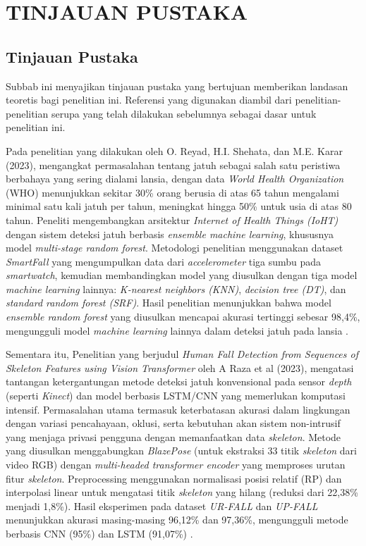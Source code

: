 \newpage
\chapter{TINJAUAN PUSTAKA} \label{Bab II}

\section{Tinjauan Pustaka} \label{II.Tinjauan}
Subbab ini menyajikan tinjauan pustaka yang bertujuan memberikan landasan teoretis bagi penelitian ini. Referensi yang digunakan diambil dari penelitian-penelitian serupa yang telah dilakukan sebelumnya sebagai dasar untuk penelitian ini. \par
\renewcommand{\arraystretch}{1.0} %

Pada penelitian yang dilakukan oleh O. Reyad, H.I. Shehata, dan M.E. Karar (2023), mengangkat permasalahan tentang jatuh sebagai salah satu peristiwa berbahaya yang sering dialami lansia, dengan data \textit{World Health Organization} (WHO) menunjukkan sekitar 30\% orang berusia di atas 65 tahun mengalami minimal satu kali jatuh per tahun, meningkat hingga 50\% untuk usia di atas 80 tahun. Peneliti mengembangkan arsitektur \textit{Internet of Health Things (IoHT)} dengan sistem deteksi jatuh berbasis \textit{ensemble machine learning}, khususnya model \textit{multi-stage random forest}. Metodologi penelitian menggunakan dataset \textit{SmartFall} yang mengumpulkan data dari \textit{accelerometer} tiga sumbu pada \textit{smartwatch}, kemudian membandingkan model yang diusulkan dengan tiga model \textit{machine learning} lainnya: \textit{K-nearest neighbors (KNN)}, \textit{decision tree (DT)}, dan \textit{standard random forest (SRF)}. Hasil penelitian menunjukkan bahwa model \textit{ensemble random forest} yang diusulkan mencapai akurasi tertinggi sebesar 98,4\%, mengungguli model \textit{machine learning} lainnya dalam deteksi jatuh pada lansia \cite{Reyad2023}. \par

Sementara itu, Penelitian yang berjudul \textit{Human Fall Detection from Sequences of Skeleton Features using Vision Transformer} oleh A Raza et al (2023), mengatasi tantangan ketergantungan metode deteksi jatuh konvensional pada sensor \textit{depth} (seperti \textit{Kinect}) dan model berbasis LSTM/CNN yang memerlukan komputasi intensif. Permasalahan utama termasuk keterbatasan akurasi dalam lingkungan dengan variasi pencahayaan, oklusi, serta kebutuhan akan sistem non-intrusif yang menjaga privasi pengguna dengan memanfaatkan data \textit{skeleton}. Metode yang diusulkan menggabungkan \textit{BlazePose} (untuk ekstraksi 33 titik \textit{skeleton} dari video RGB) dengan \textit{multi-headed transformer encoder} yang memproses urutan fitur \textit{skeleton}. Preprocessing menggunakan normalisasi posisi relatif (RP) dan interpolasi linear untuk mengatasi titik \textit{skeleton} yang hilang (reduksi dari 22,38\% menjadi 1,8\%). Hasil eksperimen pada dataset \textit{UR-FALL} dan \textit{UP-FALL} menunjukkan akurasi masing-masing 96,12\% dan 97,36\%, mengungguli metode berbasis CNN (95\%) dan LSTM (91,07\%) \cite{Raza2023}. \par

